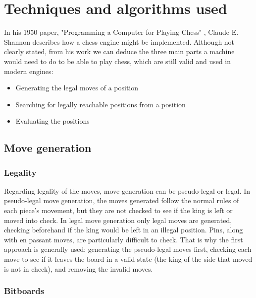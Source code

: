 \chapter{Techniques and algorithms used}
\label{chap:ch2}

In his 1950 paper, "Programming a Computer for Playing Chess" \cite{shannon1950xxii}, Claude E. Shannon describes how a chess engine might be implemented. Although not clearly stated, from his work we can deduce the three main parts a machine would need to do to be able to play chess, which are still valid and used in modern engines:
\begin{itemize}
    \item Generating the legal moves of a position
    \item Searching for legally reachable positions from a position
    \item Evaluating the positions
\end{itemize}

\section{Move generation}
\label{sec:ch2sec1}

\subsection{Legality}
\label{subsec:ch2sec1subsec1}

Regarding legality of the moves, move generation can be pseudo-legal or legal. In pseudo-legal move generation, the moves generated follow the normal rules of each piece's movement, but they are not checked to see if the king is left or moved into check. In legal move generation only legal moves are generated, checking beforehand if the king would be left in an illegal position. Pins, along with en passant moves, are particularly difficult to check. That is why the first approach is generally used: generating the pseudo-legal moves first, checking each move to see if it leaves the board in a valid state (the king of the side that moved is not in check), and removing the invalid moves.

\subsection{Bitboards}
\label{subsec:ch2sec1subsec2}


